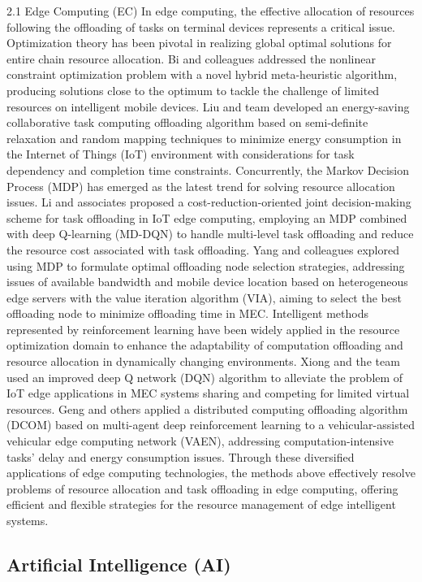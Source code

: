 \documentclass[preprint,12pt,authoryear]{elsarticle}
\begin{document}
2.1 Edge Computing (EC)
In edge computing, the effective allocation of resources following the offloading of tasks on terminal devices represents a critical issue. Optimization theory has been pivotal in realizing global optimal solutions for entire chain resource allocation. Bi and colleagues addressed the nonlinear constraint optimization problem with a novel hybrid meta-heuristic algorithm, producing solutions close to the optimum to tackle the challenge of limited resources on intelligent mobile devices. Liu and team developed an energy-saving collaborative task computing offloading algorithm based on semi-definite relaxation and random mapping techniques to minimize energy consumption in the Internet of Things (IoT) environment with considerations for task dependency and completion time constraints. Concurrently, the Markov Decision Process (MDP) has emerged as the latest trend for solving resource allocation issues. Li and associates proposed a cost-reduction-oriented joint decision-making scheme for task offloading in IoT edge computing, employing an MDP combined with deep Q-learning (MD-DQN) to handle multi-level task offloading and reduce the resource cost associated with task offloading. Yang and colleagues explored using MDP to formulate optimal offloading node selection strategies, addressing issues of available bandwidth and mobile device location based on heterogeneous edge servers with the value iteration algorithm (VIA), aiming to select the best offloading node to minimize offloading time in MEC. Intelligent methods represented by reinforcement learning have been widely applied in the resource optimization domain to enhance the adaptability of computation offloading and resource allocation in dynamically changing environments. Xiong and the team used an improved deep Q network (DQN) algorithm to alleviate the problem of IoT edge applications in MEC systems sharing and competing for limited virtual resources. Geng and others applied a distributed computing offloading algorithm (DCOM) based on multi-agent deep reinforcement learning to a vehicular-assisted vehicular edge computing network (VAEN), addressing computation-intensive tasks' delay and energy consumption issues. Through these diversified applications of edge computing technologies, the methods above effectively resolve problems of resource allocation and task offloading in edge computing, offering efficient and flexible strategies for the resource management of edge intelligent systems.

\subsection{Artificial Intelligence (AI)}
\end{document}
